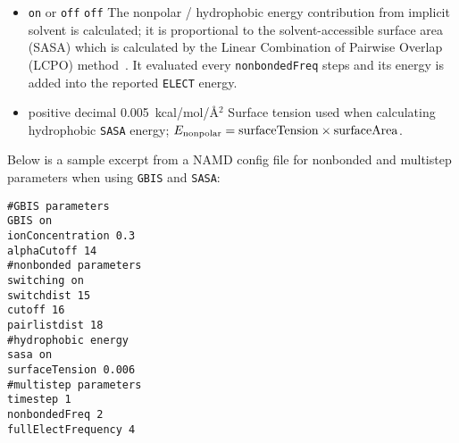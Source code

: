 \begin{itemize}
\item
{} {{\tt on} or {\tt off}} {{\tt off}} {The nonpolar / hydrophobic energy contribution from implicit solvent is calculated; it is proportional to the solvent-accessible surface area (SASA) which is calculated by the Linear Combination of Pairwise Overlap (LCPO) method~\cite{WEIS99}. It evaluated every {\tt nonbondedFreq} steps and its energy is added into the reported {\tt ELECT} energy.}

\item
{} {positive decimal} {0.005~kcal/mol/\AA$^2$} {Surface tension used when calculating hydrophobic {\tt SASA} energy; $E_{\rm nonpolar} = {\rm surfaceTension} \times {\rm surfaceArea}$.}

\end{itemize}

Below is a sample excerpt from a NAMD config file for nonbonded and multistep parameters when using {\tt GBIS} and {\tt SASA}:
\begin{verbatim}
#GBIS parameters
GBIS on
ionConcentration 0.3
alphaCutoff 14
#nonbonded parameters
switching on
switchdist 15
cutoff 16
pairlistdist 18
#hydrophobic energy
sasa on
surfaceTension 0.006
#multistep parameters
timestep 1
nonbondedFreq 2
fullElectFrequency 4
\end{verbatim}
%
%
%

\begin{comment}

\end{comment}
